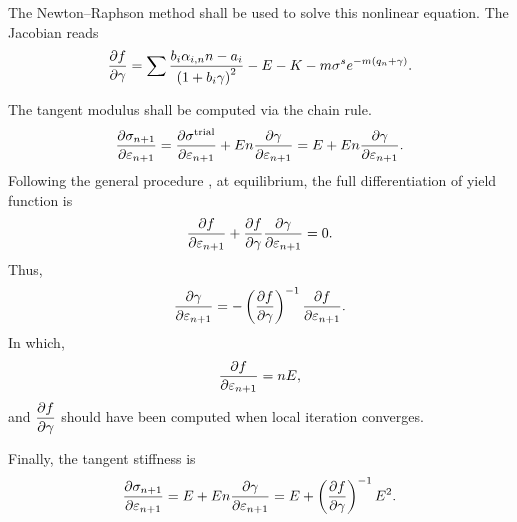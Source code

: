 The Newton--Raphson method shall be used to solve this nonlinear equation. The Jacobian reads
\begin{gather}\label{eq:af_pfpg}
\dfrac{\partial{f}}{\partial{\gamma}}=\sum\dfrac{b_i\alpha_{i,n}n-a_i}{\left(1+b_i\gamma\right)^2}-E-K-m\sigma^se^{-m\left(q_n+\gamma\right)}.
\end{gather}

The tangent modulus shall be computed via the chain rule.
\begin{gather}
\dfrac{\partial{\sigma_{n+1}}}{\partial{\varepsilon_{n+1}}}=\dfrac{\partial{\sigma^\text{trial}}}{\partial{\varepsilon_{n+1}}}+En\dfrac{\partial{\gamma}}{\partial{\varepsilon_{n+1}}}=E+En\dfrac{\partial{\gamma}}{\partial{\varepsilon_{n+1}}}.
\end{gather}
Following the general procedure , at equilibrium, the full differentiation of yield function is
\begin{gather}
\dfrac{\partial{f}}{\partial{\varepsilon_{n+1}}}+\dfrac{\partial{f}}{\partial{\gamma}}\dfrac{\partial{\gamma}}{\partial{\varepsilon_{n+1}}}=0.
\end{gather}
Thus,
\begin{gather}
\dfrac{\partial{\gamma}}{\partial{\varepsilon_{n+1}}}=-\left(\dfrac{\partial{f}}{\partial{\gamma}}\right)^{-1}\dfrac{\partial{f}}{\partial{\varepsilon_{n+1}}}.
\end{gather}
In which,
\begin{gather}
\dfrac{\partial{f}}{\partial{\varepsilon_{n+1}}}=nE,
\end{gather}
and $\dfrac{\partial{f}}{\partial{\gamma}}$ should have been computed when local iteration converges.

Finally, the tangent stiffness is
\begin{gather}
\dfrac{\partial{\sigma_{n+1}}}{\partial{\varepsilon_{n+1}}}=E+En\dfrac{\partial{\gamma}}{\partial{\varepsilon_{n+1}}}=E+\left(\dfrac{\partial{f}}{\partial{\gamma}}\right)^{-1}E^2.
\end{gather}
